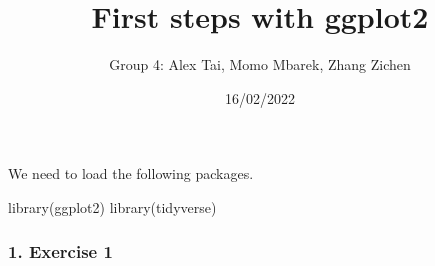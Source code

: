 \documentclass[
]{article}
\title{First steps with ggplot2}
\author{Group 4: Alex Tai, Momo Mbarek, Zhang Zichen}
\date{16/02/2022}
\newenvironment{Shaded}{\begin{snugshade}}{\end{snugshade}}
\newcommand{\FunctionTok}[1]{\textcolor[rgb]{0.00,0.00,0.00}{#1}}
\newcommand{\NormalTok}[1]{#1}
\begin{document}
\maketitle

We need to load the following packages.

\begin{Shaded}
\begin{Highlighting}[]
\FunctionTok{library}\NormalTok{(ggplot2)}
\FunctionTok{library}\NormalTok{(tidyverse)}
\end{Highlighting}
\end{Shaded}

\hypertarget{exercise-1}{%
\subsubsection{1. Exercise 1}\label{exercise-1}}
\end{document}
